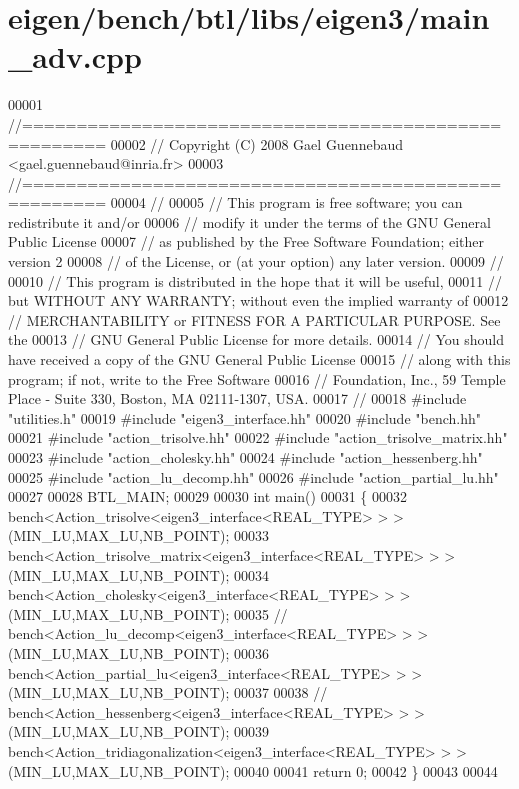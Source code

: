 \hypertarget{eigen_2bench_2btl_2libs_2eigen3_2main__adv_8cpp_source}{}\section{eigen/bench/btl/libs/eigen3/main\+\_\+adv.cpp}
\label{eigen_2bench_2btl_2libs_2eigen3_2main__adv_8cpp_source}

\begin{DoxyCode}
00001 \textcolor{comment}{//=====================================================}
00002 \textcolor{comment}{// Copyright (C) 2008 Gael Guennebaud <gael.guennebaud@inria.fr>}
00003 \textcolor{comment}{//=====================================================}
00004 \textcolor{comment}{//}
00005 \textcolor{comment}{// This program is free software; you can redistribute it and/or}
00006 \textcolor{comment}{// modify it under the terms of the GNU General Public License}
00007 \textcolor{comment}{// as published by the Free Software Foundation; either version 2}
00008 \textcolor{comment}{// of the License, or (at your option) any later version.}
00009 \textcolor{comment}{//}
00010 \textcolor{comment}{// This program is distributed in the hope that it will be useful,}
00011 \textcolor{comment}{// but WITHOUT ANY WARRANTY; without even the implied warranty of}
00012 \textcolor{comment}{// MERCHANTABILITY or FITNESS FOR A PARTICULAR PURPOSE.  See the}
00013 \textcolor{comment}{// GNU General Public License for more details.}
00014 \textcolor{comment}{// You should have received a copy of the GNU General Public License}
00015 \textcolor{comment}{// along with this program; if not, write to the Free Software}
00016 \textcolor{comment}{// Foundation, Inc., 59 Temple Place - Suite 330, Boston, MA  02111-1307, USA.}
00017 \textcolor{comment}{//}
00018 \textcolor{preprocessor}{#include "utilities.h"}
00019 \textcolor{preprocessor}{#include "eigen3\_interface.hh"}
00020 \textcolor{preprocessor}{#include "bench.hh"}
00021 \textcolor{preprocessor}{#include "action\_trisolve.hh"}
00022 \textcolor{preprocessor}{#include "action\_trisolve\_matrix.hh"}
00023 \textcolor{preprocessor}{#include "action\_cholesky.hh"}
00024 \textcolor{preprocessor}{#include "action\_hessenberg.hh"}
00025 \textcolor{preprocessor}{#include "action\_lu\_decomp.hh"}
00026 \textcolor{preprocessor}{#include "action\_partial\_lu.hh"}
00027 
00028 BTL\_MAIN;
00029 
00030 \textcolor{keywordtype}{int} main()
00031 \{
00032   bench<Action\_trisolve<eigen3\_interface<REAL\_TYPE> > >(MIN\_LU,MAX\_LU,NB\_POINT);
00033   bench<Action\_trisolve\_matrix<eigen3\_interface<REAL\_TYPE> > >(MIN\_LU,MAX\_LU,NB\_POINT);
00034   bench<Action\_cholesky<eigen3\_interface<REAL\_TYPE> > >(MIN\_LU,MAX\_LU,NB\_POINT);
00035 \textcolor{comment}{//   bench<Action\_lu\_decomp<eigen3\_interface<REAL\_TYPE> > >(MIN\_LU,MAX\_LU,NB\_POINT);}
00036   bench<Action\_partial\_lu<eigen3\_interface<REAL\_TYPE> > >(MIN\_LU,MAX\_LU,NB\_POINT);
00037 
00038 \textcolor{comment}{//   bench<Action\_hessenberg<eigen3\_interface<REAL\_TYPE> > >(MIN\_LU,MAX\_LU,NB\_POINT);}
00039   bench<Action\_tridiagonalization<eigen3\_interface<REAL\_TYPE> > >(MIN\_LU,MAX\_LU,NB\_POINT);
00040 
00041   \textcolor{keywordflow}{return} 0;
00042 \}
00043 
00044 
\end{DoxyCode}
